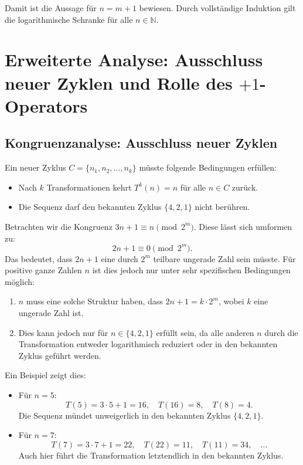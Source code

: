\documentclass[a4paper,12pt]{article}
\begin{document}
Damit ist die Aussage für \( n = m + 1 \) bewiesen. Durch vollständige Induktion gilt die logarithmische Schranke für alle \( n \in \mathbb{N} \).

\section{Erweiterte Analyse: Ausschluss neuer Zyklen und Rolle des \(+1\)-Operators}

\subsection{Kongruenzanalyse: Ausschluss neuer Zyklen}
Ein neuer Zyklus \( C = \{n_1, n_2, \dots, n_k\} \) müsste folgende Bedingungen erfüllen:
\begin{itemize}
    \item Nach \( k \) Transformationen kehrt \( T^k(n) = n \) für alle \( n \in C \) zurück.
    \item Die Sequenz darf den bekannten Zyklus \( \{4, 2, 1\} \) nicht berühren.
\end{itemize}

Betrachten wir die Kongruenz \( 3n + 1 \equiv n \pmod{2^m} \). Diese lässt sich umformen zu:
\[
2n + 1 \equiv 0 \pmod{2^m}.
\]
Das bedeutet, dass \( 2n + 1 \) eine durch \( 2^m \) teilbare ungerade Zahl sein müsste. Für positive ganze Zahlen \( n \) ist dies jedoch nur unter sehr spezifischen Bedingungen möglich:
\begin{enumerate}
    \item \( n \) muss eine solche Struktur haben, dass \( 2n + 1 = k \cdot 2^m \), wobei \( k \) eine ungerade Zahl ist.
    \item Dies kann jedoch nur für \( n \in \{4, 2, 1\} \) erfüllt sein, da alle anderen \( n \) durch die Transformation entweder logarithmisch reduziert oder in den bekannten Zyklus geführt werden.
\end{enumerate}

Ein Beispiel zeigt dies:
\begin{itemize}
    \item Für \( n = 5 \): 
    \[
    T(5) = 3 \cdot 5 + 1 = 16, \quad T(16) = 8, \quad T(8) = 4.
    \]
    Die Sequenz mündet unweigerlich in den bekannten Zyklus \( \{4, 2, 1\} \).
    \item Für \( n = 7 \): 
    \[
    T(7) = 3 \cdot 7 + 1 = 22, \quad T(22) = 11, \quad T(11) = 34, \quad \dots
    \]
    Auch hier führt die Transformation letztendlich in den bekannten Zyklus.
\end{itemize}
\end{document}
